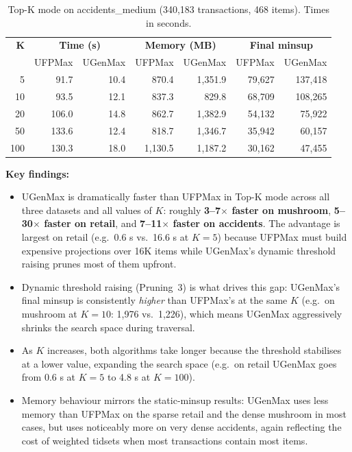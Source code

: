 \documentclass[12pt,a4paper]{report}
\begin{document}
\begin{table}[h]
\centering
\caption{Top-K mode on accidents\_medium (340,183 transactions, 468 items). Times in seconds.}
\label{tab:topk_accidents}
\begin{tabular}{rrrrrrr}
\toprule
\textbf{K} & \multicolumn{2}{c}{\textbf{Time (s)}} & \multicolumn{2}{c}{\textbf{Memory (MB)}} & \multicolumn{2}{c}{\textbf{Final minsup}} \\
 & UFPMax & UGenMax & UFPMax & UGenMax & UFPMax & UGenMax \\
\midrule
5 & 91.7 & 10.4 & 870.4 & 1,351.9 & 79,627 & 137,418 \\
10 & 93.5 & 12.1 & 837.3 & 829.8 & 68,709 & 108,265 \\
20 & 106.0 & 14.8 & 862.7 & 1,382.9 & 54,132 & 75,922 \\
50 & 133.6 & 12.4 & 818.7 & 1,346.7 & 35,942 & 60,157 \\
100 & 130.3 & 18.0 & 1,130.5 & 1,187.2 & 30,162 & 47,455 \\
\bottomrule
\end{tabular}
\end{table}

\textbf{Key findings:}
\begin{itemize}
  \item UGenMax is dramatically faster than UFPMax in Top-K mode across all three datasets and all values of $K$: roughly \textbf{3--7$\times$ faster on mushroom}, \textbf{5--30$\times$ faster on retail}, and \textbf{7--11$\times$ faster on accidents}. The advantage is largest on retail (e.g.\ 0.6 s vs.\ 16.6 s at $K{=}5$) because UFPMax must build expensive projections over 16K items while UGenMax's dynamic threshold raising prunes most of them upfront.
  \item Dynamic threshold raising (Pruning~3) is what drives this gap: UGenMax's final minsup is consistently \emph{higher} than UFPMax's at the same $K$ (e.g.\ on mushroom at $K{=}10$: 1,976 vs.\ 1,226), which means UGenMax aggressively shrinks the search space during traversal.
  \item As $K$ increases, both algorithms take longer because the threshold stabilises at a lower value, expanding the search space (e.g.\ on retail UGenMax goes from 0.6 s at $K{=}5$ to 4.8 s at $K{=}100$).
  \item Memory behaviour mirrors the static-minsup results: UGenMax uses less memory than UFPMax on the sparse retail and the dense mushroom in most cases, but uses noticeably more on very dense accidents, again reflecting the cost of weighted tidsets when most transactions contain most items.
\end{itemize}
\end{document}
